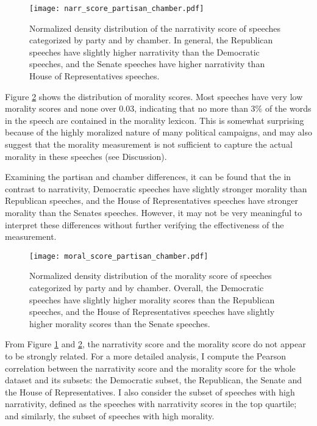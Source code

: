 \documentclass[a4paper]{article}
\begin{document}
\begin{figure}
\centering
\texttt{[image: narr\_score\_partisan\_chamber.pdf]}
\caption{\label{fig:narrativity} Normalized density distribution of the narrativity score of speeches categorized by party and by chamber. In general, the Republican speeches have slightly higher narrativity than the Democratic speeches, and the Senate speeches have higher narrativity than House of Representatives speeches.}
\end{figure}

Figure \ref{fig:morality} shows the distribution of morality scores. Most speeches have very low morality scores and none over 0.03, indicating that no more than 3\% of the words in the speech are contained in the morality lexicon. This is somewhat surprising because of the highly moralized nature of many political campaigns, and may also suggest that the morality measurement is not sufficient to capture the actual morality in these speeches (see Discussion). 

Examining the partisan and chamber differences, it can be found that the in contrast to narrativity, Democratic speeches have slightly stronger morality than Republican speeches, and the House of Representatives speeches have stronger morality than the Senates speeches. However, it may not be very meaningful to interpret these differences without further verifying the effectiveness of the measurement.

\begin{figure}
\centering
\texttt{[image: moral\_score\_partisan\_chamber.pdf]}
\caption{\label{fig:morality}Normalized density distribution of the morality score of speeches categorized by party and by chamber. Overall, the Democratic speeches have slightly higher morality scores than the Republican speeches, and the House of Representatives speeches have slightly higher morality scores than the Senate speeches.}
\end{figure}

From Figure \ref{fig:narrativity} and \ref{fig:morality}, the narrativity score and the morality score do not appear to be strongly related. For a more detailed analysis, I compute the Pearson correlation between the narrativity score and the morality score for the whole dataset and its subsets: the Democratic subset, the Republican, the Senate and the House of Representatives. I also consider the subset of speeches with high narrativity, defined as the speeches with narrativity scores in the top quartile; and similarly, the subset of speeches with high morality.
\end{document}

